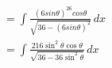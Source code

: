 \documentclass[preview]{standalone}
\begin{document}
\begin{align*}
&=\int \frac{(6sin\theta)^26cos\theta}{\sqrt{36-(6sin\theta)^2}} \, dx \\ &=\int \frac{216\sin^2\theta\cos\theta}{\sqrt{36-36\sin^2\theta}} \, dx
\end{align*}
\end{document}
